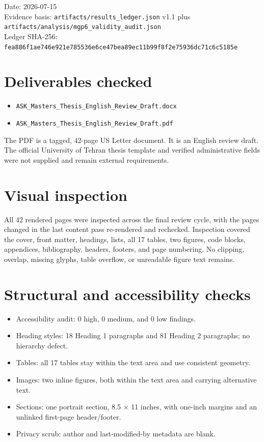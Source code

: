 Date: 2026-07-15\\
Evidence basis: \texttt{artifacts/results\_ledger.json} v1.1 plus
\texttt{artifacts/analysis/mgp6\_validity\_audit.json}\\
Ledger SHA-256:
\texttt{fea886f1ae746e921e785536e6ce47bea89ec11b99f8f2e75936dc71c6c5185e}

\section{Deliverables checked}\label{deliverables-checked}

\begin{itemize}
\tightlist
\item
  \texttt{ASK\_Masters\_Thesis\_English\_Review\_Draft.docx}
\item
  \texttt{ASK\_Masters\_Thesis\_English\_Review\_Draft.pdf}
\end{itemize}

The PDF is a tagged, 42-page US Letter document. It is an English review
draft. The official University of Tehran thesis template and verified
administrative fields were not supplied and remain external
requirements.

\section{Visual inspection}\label{visual-inspection}

All 42 rendered pages were inspected across the final review cycle, with
the pages changed in the last content pass re-rendered and rechecked.
Inspection covered the cover, front matter, headings, lists, all 17
tables, two figures, code blocks, appendices, bibliography, headers,
footers, and page numbering. No clipping, overlap, missing glyphs, table
overflow, or unreadable figure text remains.

\section{Structural and accessibility
checks}\label{structural-and-accessibility-checks}

\begin{itemize}
\tightlist
\item
  Accessibility audit: 0 high, 0 medium, and 0 low findings.
\item
  Heading styles: 18 Heading 1 paragraphs and 81 Heading 2 paragraphs;
  no hierarchy defect.
\item
  Tables: all 17 tables stay within the text area and use consistent
  geometry.
\item
  Images: two inline figures, both within the text area and carrying
  alternative text.
\item
  Sections: one portrait section, 8.5 × 11 inches, with one-inch margins
  and an unlinked first-page header/footer.
\item
  Privacy scrub: author and last-modified-by metadata are blank.
\end{itemize}

